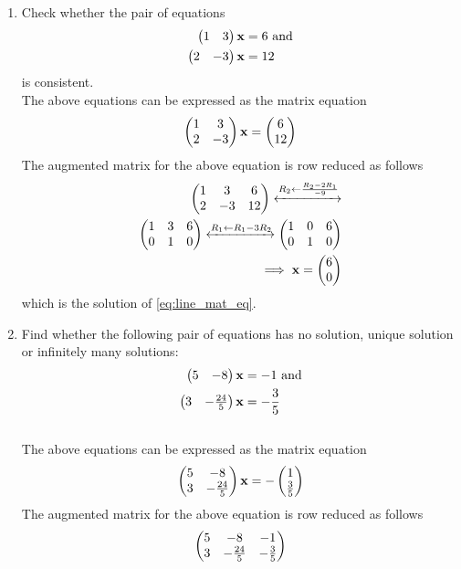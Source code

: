\documentclass[journal,12pt,twocolumn]{IEEEtran}
\renewcommand\thesection{\arabic{section}}
\begin{document}
\begin{enumerate}[label=\thesection.\arabic*.,ref=\thesection.\theenumi]
\item Check whether the pair of equations 
\begin{align}
\label{eq:line_mat_eq_2}
\begin{split}
\begin{pmatrix} 1 & 3\end{pmatrix}\mathbf{x}  &= 6 \text{ and}
\\
\begin{pmatrix}  2 & -3\end{pmatrix}\mathbf{x} &= 12 
\end{split}
\end{align}
%
is consistent. 
\\
\solution The above equations can be expressed as the matrix equation
\begin{align}
\begin{pmatrix} 1 & 3\\2 & -3\end{pmatrix} \mathbf{x} = \begin{pmatrix} 6\\12\end{pmatrix}
\end{align}
%
The augmented matrix for the above equation is row reduced as follows
\begin{align}
\begin{pmatrix} 1 & 3 & 6\\2 & -3 & 12\end{pmatrix} 
\xleftrightarrow {R_2\leftarrow \frac{R_2-2R_1}{-9}}
\\
\begin{pmatrix} 1 & 3 & 6\\0 & 1 & 0\end{pmatrix} 
\xleftrightarrow {R_1\leftarrow R_1 - 3R_2}\begin{pmatrix} 1 & 0 & 6\\0 & 1 & 0\end{pmatrix} 
\\
\implies \mathbf{x} = \begin{pmatrix} 6\\0\end{pmatrix}
\end{align}
%
which is the solution of \ref{eq:line_mat_eq}.
%
\item Find whether the following pair of equations has no solution, unique solution or infinitely many solutions: 
%
\begin{align}
\label{eq:line_check_sol3}
\begin{split}
\begin{pmatrix} 5 & -8\end{pmatrix}\mathbf{x}  &= -1 \text{ and}
\\
\begin{pmatrix}  3 & -\frac{24}{5}\end{pmatrix}\mathbf{x} &= -\frac{3}{5}
\end{split}
\end{align}
%
\\
\solution The above equations can be expressed as the matrix equation
\begin{align}
\begin{pmatrix} 5 & -8\\3 & -\frac{24}{5}\end{pmatrix} \mathbf{x} = -\begin{pmatrix} 1\\ \frac{3}{5}\end{pmatrix}
\end{align}
%
The augmented matrix for the above equation is row reduced as follows
\begin{align}
\myvec{5 & -8 & -1 \\3 & -\frac{24}{5} & -\frac{3}{5}} 

\end{align}
\end{enumerate}
\end{document}
